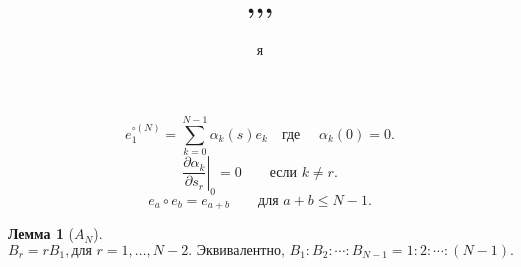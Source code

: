 \documentclass[a4paper, 10pt]{article}
\author{я}
\title{,,,}
\theoremstyle{plain}
\newtheorem{lem}{Лемма}
\begin{document}
	\maketitle
		\begin{equation}
		e_1^{\circ(N)}
		=
		\sum_{k=0}^{N-1}\alpha_k(s)e_k \quad \text{где } \quad \alpha_k(0)=0.
		\label{eq:fundamental_relation} 
	\end{equation}
		\begin{equation}
		\left.\frac{\partial\alpha_k}{\partial s_r}\right|_0=0 \qquad\text{если }k\ne r.
		\label{eq:weight_diagonal}
	\end{equation}
		\begin{equation}
		e_a\circ e_b=e_{a+b}
		\qquad\text{для }a+b\le N-1.
		\label{eq:low_product}
	\end{equation}
	\begin{lem}[$A_N$]
		\[B_r=rB_1,\text{для } r=1,\ldots,N-2.
		\text{ Эквивалентно, } B_1:B_2:\cdots:B_{N-1}=1:2:\cdots:(N-1).\]
	\end{lem}
\end{document}
